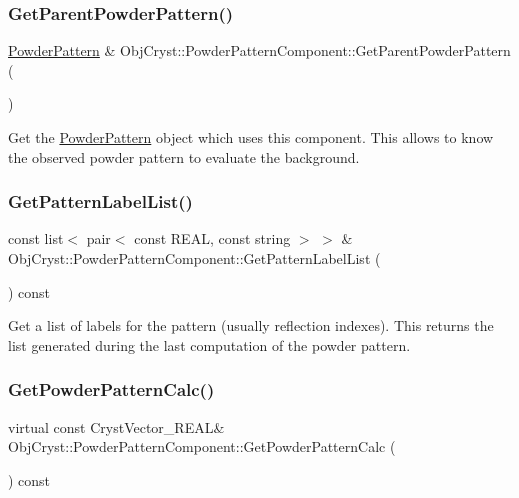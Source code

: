\subsubsection{\texorpdfstring{GetParentPowderPattern()}{GetParentPowderPattern()}\hspace{0.1cm}{\footnotesize\ttfamily [2/2]}}
{\footnotesize\ttfamily \mbox{\hyperlink{class_obj_cryst_1_1_powder_pattern}{Powder\+Pattern}} \& Obj\+Cryst\+::\+Powder\+Pattern\+Component\+::\+Get\+Parent\+Powder\+Pattern (\begin{DoxyParamCaption}{ }\end{DoxyParamCaption})}

Get the \mbox{\hyperlink{class_obj_cryst_1_1_powder_pattern}{Powder\+Pattern}} object which uses this component. This allows to know the observed powder pattern to evaluate the background. \mbox{\label{class_obj_cryst_1_1_powder_pattern_component_af96a48a4f92609072bd42d6c53549c45}} 
\subsubsection{\texorpdfstring{GetPatternLabelList()}{GetPatternLabelList()}}
{\footnotesize\ttfamily const list$<$ pair$<$ const R\+E\+AL, const string $>$ $>$ \& Obj\+Cryst\+::\+Powder\+Pattern\+Component\+::\+Get\+Pattern\+Label\+List (\begin{DoxyParamCaption}{ }\end{DoxyParamCaption}) const}

Get a list of labels for the pattern (usually reflection indexes). This returns the list generated during the last computation of the powder pattern. \mbox{\label{class_obj_cryst_1_1_powder_pattern_component_a45258e9f9b44ff019bf53aa3dfb1a305}} 
\subsubsection{\texorpdfstring{GetPowderPatternCalc()}{GetPowderPatternCalc()}}
{\footnotesize\ttfamily virtual const Cryst\+Vector\+\_\+\+R\+E\+AL\& Obj\+Cryst\+::\+Powder\+Pattern\+Component\+::\+Get\+Powder\+Pattern\+Calc (\begin{DoxyParamCaption}{ }\end{DoxyParamCaption}) const\hspace{0.3cm}{\ttfamily [pure virtual]}}

